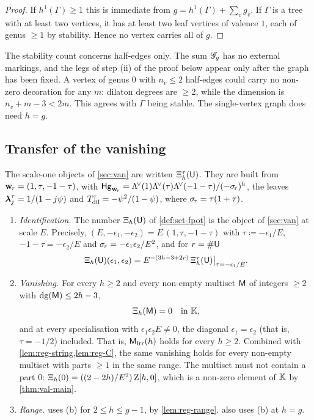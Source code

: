 \begin{proof}
If $h^1(\Gamma)\geq 1$ this is immediate from $g=h^1(\Gamma)+\sum_{v}g_{v}$. If $\Gamma$ is a tree with at least two vertices, it has at least two leaf vertices of valence $1$, each of genus $\geq 1$ by stability. Hence no vertex carries all of $g$.
\end{proof}

The stability count concerns half-edges only. The sum $\mathscr{G}_g$ has no external markings, and the legs of step (ii) of the proof below appear only after the graph has been fixed. A vertex of genus $0$ with $n_{v}\leq 2$ half-edges could carry no non-zero decoration for any $m$: dilaton degrees are $\geq 2$, while the dimension is $n_{v}+m-3<2m$. This agrees with $\Gamma$ being stable. The single-vertex graph does need $h=g$.

\subsection{Transfer of the vanishing}

The scale-one objects of \cref{sec:van} are written $\Xi^{\tau}_h(\mathsf{U})$. They are built from $\mathbf{w}_{\!\tau}=(1,\tau,-1-\tau)$, with $\mathsf{Hg}_{\mathbf{w}_{\!\tau}}=\Lambda^{\!\vee}(1)\Lambda^{\!\vee}(\tau)\Lambda^{\!\vee}(-1-\tau)/(-\sigma_{\!\tau})^h$, the leaves $\boldsymbol{\lambda}^{\tau}_j=1/(1-j\psi)$ and $T_{\mathrm{dil}}^{\tau}=-\psi^2/(1-\psi)$, where $\sigma_{\!\tau}=\tau(1+\tau)$.

\begin{lem}
\label{lem:reg-A}\leavevmode
\begin{enumerate}
\item[(a)] \emph{Identification.} The number $\Xi_h(\mathsf{U})$ of \cref{def:set-fpot} is the object of \cref{sec:van} at scale $E$. Precisely, $(E,-\epsilon_1,-\epsilon_2)=E\,(1,\tau,-1-\tau)$ with $\tau\coloneqq-\epsilon_1/E$, $-1-\tau=-\epsilon_2/E$ and $\sigma_{\!\tau}=-\epsilon_1\epsilon_2/E^2$, and for $r=\#\mathsf{U}$
\begin{equation}
\label{eq:reg-scale}
\Xi_h(\mathsf{U})(\epsilon_1,\epsilon_2)=E^{-(3h-3+2r)}\,\Xi^{\tau}_h(\mathsf{U})\big|_{\tau=-\epsilon_1/E}.
\end{equation}
\item[(b)] \emph{Vanishing.} For every $h\geq 2$ and every non-empty multiset $\mathsf{M}$ of integers $\geq 2$ with $\mathrm{dg}(\mathsf{M})\leq 2h-3$,
\[
\Xi_h(\mathsf{M})=0\quad\text{in }\mathbb{K},
\]
and at every specialisation with $\epsilon_1\epsilon_2E\neq 0$, the diagonal $\epsilon_1=\epsilon_2$ (that is, $\tau=-1/2$) included. That is, $\mathsf{M}_{\mathrm{irr}}(h)$ holds for every $h\geq 2$. Combined with \cref{lem:reg-string,lem:reg-C}, the same vanishing holds for every non-empty multiset with parts $\geq 1$ in the same range. The multiset must not contain a part $0$: $\Xi_h(0)=((2-2h)/E^2)\,\mathrm{Z}[h,0]$, which is a non-zero element of $\mathbb{K}$ by \cref{thm:val-main}.
\item[(c)] \emph{Range.}  uses (b) for $2\leq h\leq g-1$, by \cref{lem:reg-range}.  also uses (b) at $h=g$.
\end{enumerate}
\end{lem}

